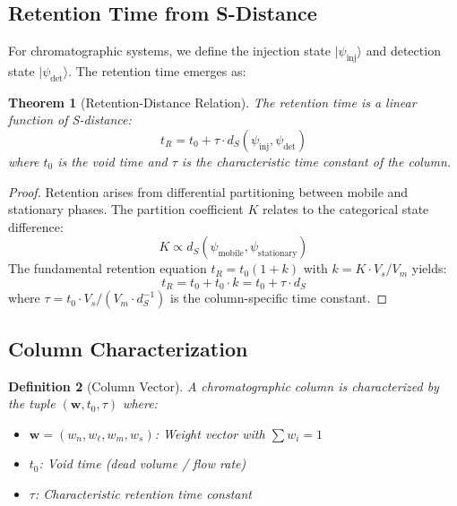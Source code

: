\documentclass[twocolumn,10pt]{article}
\newtheorem{theorem}{Theorem}[section]
\newtheorem{definition}[theorem]{Definition}
\begin{document}
\subsection{Retention Time from S-Distance}

For chromatographic systems, we define the injection state $|\psi_{\text{inj}}\rangle$ and detection state $|\psi_{\text{det}}\rangle$. The retention time emerges as:

\begin{theorem}[Retention-Distance Relation]
\label{thm:retention}
The retention time is a linear function of S-distance:
\begin{equation}
t_R = t_0 + \tau \cdot d_S(\psi_{\text{inj}}, \psi_{\text{det}})
\end{equation}
where $t_0$ is the void time and $\tau$ is the characteristic time constant of the column.
\end{theorem}

\begin{proof}
Retention arises from differential partitioning between mobile and stationary phases. The partition coefficient $K$ relates to the categorical state difference:
\begin{equation}
K \propto d_S(\psi_{\text{mobile}}, \psi_{\text{stationary}})
\end{equation}
The fundamental retention equation $t_R = t_0(1 + k)$ with $k = K \cdot V_s/V_m$ yields:
\begin{equation}
t_R = t_0 + t_0 \cdot k = t_0 + \tau \cdot d_S
\end{equation}
where $\tau = t_0 \cdot V_s/(V_m \cdot d_S^{-1})$ is the column-specific time constant.
\end{proof}

\subsection{Column Characterization}

\begin{definition}[Column Vector]
\label{def:column}
A chromatographic column is characterized by the tuple $(\mathbf{w}, t_0, \tau)$ where:
\begin{itemize}
    \item $\mathbf{w} = (w_n, w_\ell, w_m, w_s)$: Weight vector with $\sum w_i = 1$
    \item $t_0$: Void time (dead volume / flow rate)
    \item $\tau$: Characteristic retention time constant
\end{itemize}
\end{definition}
\end{document}
